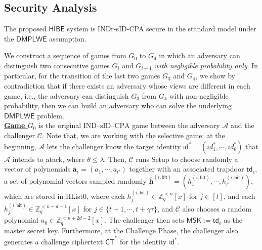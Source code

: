 \documentclass[runningheads]{llncs}
\begin{document}
\subsection{Security Analysis}
\begin{theorem}

The proposed $\mathsf{HIBE}$ system is INDr-sID-CPA secure in the standard model under the $\mathsf{DMPLWE}$ assumption.
\end{theorem}
\proof %
We construct a sequence of games from $G_0$ to $G_4$ in which an  adversary can distinguish two consecutive games $G_i$ and $G_{i+1}$ \textit{with negligible probability only}. In particular, for the transition of the last two games $G_3$ and $G_4$, we show by contradiction that if there exists an adversary whose views are different in each game, i.e., the adversary can distinguish $G_3$ from $G_4$ with non-negligible probability,  then we can build an adversary who can solve the underlying $\mathsf{DMPLWE}$ problem.\\ 

\noindent\underline{\textbf{Game $G_0$}} is the original $\text{IND--sID--CPA}$ game between the adversary $\mathcal{A}$ and the challenger $\mathcal{C}$. 
Note that, we are working with the selective game: at the beginning, $\mathcal{A}$ lets the challenger know the target identity $\mathsf{id}^*=(id^*_1, \cdots, id^*_\theta)$ that $\mathcal{A}$ intends to atack, where $\theta \leq \lambda$. Then, $\mathcal{C}$ runs \textsf{Setup} to choose randomly a vector of polynomials $\overline{\textbf{a}}_{\epsilon}=(a_1, \cdots, a_{t'})$ together with an associated trapdoor $\mathsf{td}_{\epsilon}$, a set of polynomial vectors sampled randomly $\overline{\mathbf{h}}^{(i,\mathsf{bit})}=(h_1^{(i,\mathsf{bit})}, \cdots,h_{t'}^{(i,\mathsf{bit})} )$,   which are stored in \textsf{HList0}, where each $h_{j}^{(i,\mathsf{bit})}\in \mathbb{Z}_q^{<n}[x]$ for $j\in [t]$, and each $h_{j}^{(i,\mathsf{bit})}\in \mathbb{Z}_q^{<n+d-1}[x]$  for $j\in \{t+1, \cdots, t+\gamma\tau\}$, and $\mathcal{C}$ also chooses a random polynomial $u_0 \in \mathbb{Z}_q^{<n+2d-2}[x]$. The challenger then sets $\mathsf{MSK}:=\mathsf{td}_{\epsilon}$ as the master secret key. Furthermore,  at the Challenge Phase, the challenger also generates a challenge ciphertext $\overline{\mathsf{CT}}^*$ for the identity $\mathsf{id}^*$.\\
\end{document}
